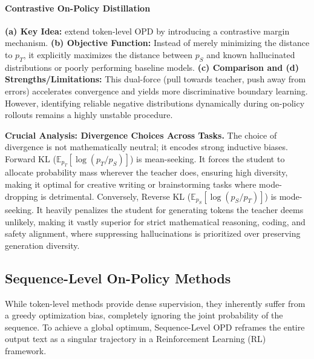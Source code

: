 \documentclass{article} %
\begin{document}
\paragraph{Contrastive On-Policy Distillation}
\textbf{(a) Key Idea:} \citet{2403.14608} extend token-level OPD by introducing a contrastive margin mechanism. 
\textbf{(b) Objective Function:} Instead of merely minimizing the distance to $p_T$, it explicitly maximizes the distance between $p_S$ and known hallucinated distributions or poorly performing baseline models.
\textbf{(c) Comparison and (d) Strengths/Limitations:} This dual-force (pull towards teacher, push away from errors) accelerates convergence and yields more discriminative boundary learning. However, identifying reliable negative distributions dynamically during on-policy rollouts remains a highly unstable procedure.

\textbf{Crucial Analysis: Divergence Choices Across Tasks.} The choice of divergence is not mathematically neutral; it encodes strong inductive biases. Forward KL ($\mathbb{E}_{p_T}[\log(p_T/p_S)]$) is mean-seeking. It forces the student to allocate probability mass wherever the teacher does, ensuring high diversity, making it optimal for creative writing or brainstorming tasks where mode-dropping is detrimental. Conversely, Reverse KL ($\mathbb{E}_{p_S}[\log(p_S/p_T)]$) is mode-seeking. It heavily penalizes the student for generating tokens the teacher deems unlikely, making it vastly superior for strict mathematical reasoning, coding, and safety alignment, where suppressing hallucinations is prioritized over preserving generation diversity.

\subsection{Sequence-Level On-Policy Methods}
\label{subsec:sequence_level}

While token-level methods provide dense supervision, they inherently suffer from a greedy optimization bias, completely ignoring the joint probability of the sequence. To achieve a global optimum, Sequence-Level OPD reframes the entire output text as a singular trajectory in a Reinforcement Learning (RL) framework.
\end{document}
